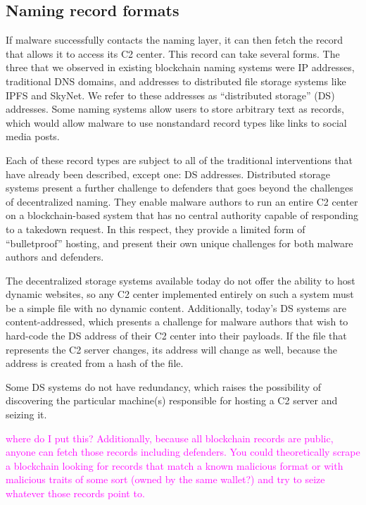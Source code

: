 \documentclass[10pt,sigconf,letterpaper]{acmart}
\newcommand{\randall}{\ding{110}\ding{43}\textcolor{magenta}}
\newcommand{\randall}{}
\begin{document}
\subsection{Naming record formats}

If malware successfully contacts the naming layer, it can then fetch the record that allows it to 
access its C2 center. 
This record can take several forms. The three that we observed in existing blockchain naming 
systems were IP addresses, 
traditional DNS domains, and addresses to distributed file storage 
systems like IPFS and SkyNet. We refer to these addresses as ``distributed storage'' (DS) 
addresses. Some naming systems allow users to store arbitrary text as records, which would allow 
malware to use nonstandard record types like links to social media posts. 

Each of these record types are subject to all of the traditional interventions that have already 
been described, except one: DS addresses. Distributed storage systems present a further challenge 
to defenders that goes beyond the challenges of decentralized naming. They enable malware authors 
to run an entire C2 center on a blockchain-based system that has no central 
authority capable of responding to a takedown request. In this respect, they provide a limited form 
of ``bulletproof'' hosting, and present their own unique challenges for 
both malware authors and defenders.

The decentralized storage systems available today do not offer the ability to host dynamic 
websites, so any C2 center implemented entirely on such a system must be a simple file with no 
dynamic content. Additionally, today's DS systems are content-addressed, which presents a challenge 
for malware authors that wish to hard-code the DS address of their C2 center into their payloads. 
If the file that represents the C2 server changes, its address will change as well, because the 
address is created from a hash of the file.

Some DS systems do not have redundancy, which raises the possibility of discovering the particular 
machine(s) responsible for hosting a C2 server and seizing it. 


\randall{where do I put this? Additionally, because all blockchain records 
are public, anyone can fetch those records including 
defenders. You could theoretically scrape a blockchain looking for records that match a known 
malicious format or with malicious traits of some sort (owned by the same wallet?) and try to seize 
whatever those records point to.} 
\end{document}
